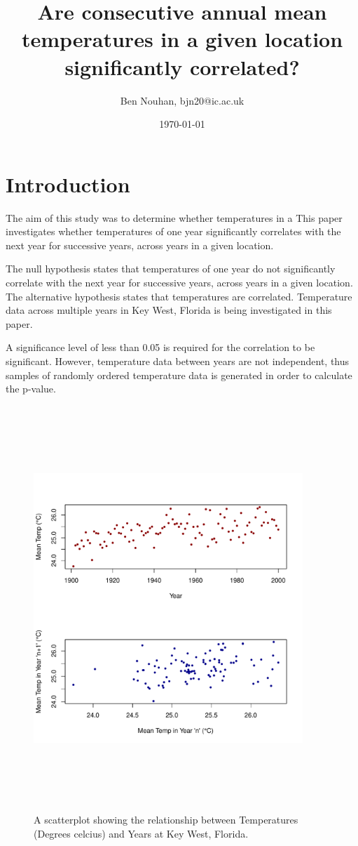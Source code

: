 \documentclass[12pt]{article}
\title{Are consecutive annual mean temperatures in a given location
significantly correlated?}
\author{Ben Nouhan, bjn20@ic.ac.uk}
\date{\today}
\begin{document}
\maketitle

\section{Introduction}

The aim of this study was to determine whether temperatures in a 
This paper investigates whether temperatures of one year significantly
correlates with the next year for successive years, across years in a 
given location.

The null hypothesis states that temperatures of one year do not 
significantly correlate with the next year for successive years, across
years in a given location. The alternative hypothesis states that 
temperatures are correlated. Temperature data across multiple years in 
Key West, Florida is being investigated in this paper.

A significance level of less than 0.05 is required for the correlation to be
significant. However, temperature data between years are not independent, thus 
samples of randomly ordered temperature data is generated in order to calculate
the p-value.

\begin{figure}[hbt!]
\centering
\includegraphics[width = 4in, height = 6in]{../data/ACC_Data.pdf}
\caption{A scatterplot showing the relationship between Temperatures 
(Degrees celcius) and Years at Key West, Florida.}
\label{fig:Fig1}
\end{figure}
    
\end{document}
